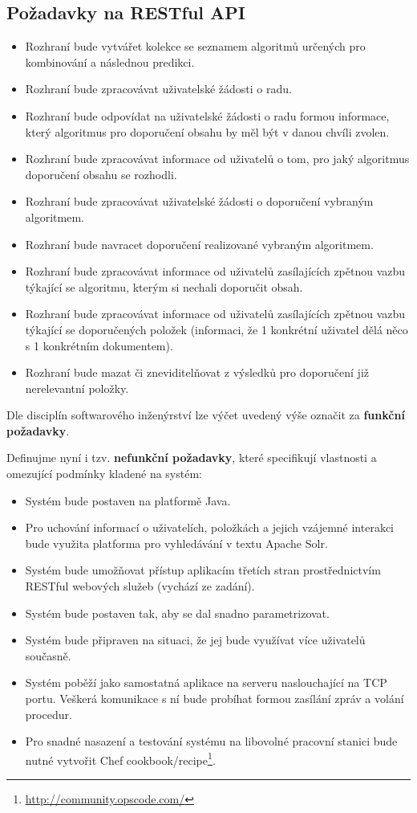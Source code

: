\documentclass[thesis=M,czech]{FITthesis}[2014/05/07]
\begin{document}
\subsection{Požadavky na RESTful API}
\begin{itemize}
	\item Rozhraní bude vytvářet kolekce se seznamem algoritmů určených pro kombinování a následnou predikci.
	\item Rozhraní bude zpracovávat uživatelské žádosti o radu.
	\item Rozhraní bude odpovídat na uživatelské žádosti o radu formou informace, který algoritmus pro doporučení obsahu by měl být v danou chvíli zvolen.
	\item Rozhraní bude zpracovávat informace od uživatelů o tom, pro jaký algoritmus doporučení obsahu se rozhodli.
	\item Rozhraní bude zpracovávat uživatelské žádosti o doporučení vybraným algoritmem.	
	\item Rozhraní bude navracet doporučení realizované vybraným algoritmem.
	\item Rozhraní bude zpracovávat informace od uživatelů zasílajících zpětnou vazbu týkající se algoritmu, kterým si nechali doporučit obsah.
	\item Rozhraní bude zpracovávat informace od uživatelů zasílajících zpětnou vazbu týkající se doporučených položek (informaci, že 1 konkrétní uživatel dělá něco s 1 konkrétním dokumentem).
	\item Rozhraní bude mazat či zneviditelňovat z výsledků pro doporučení již nerelevantní položky.
\end{itemize}

Dle disciplín softwarového inženýrství lze výčet uvedený výše označit za \textbf{funkční požadavky}.

Definujme nyní i tzv. \textbf{nefunkční požadavky}, které specifikují vlastnosti a omezující podmínky kladené na systém:

\begin{itemize}
	\item Systém bude postaven na platformě Java.
	\item Pro uchování informací o uživatelích, položkách a jejich vzájemné interakci bude využita platforma pro vyhledávání v textu Apache Solr.
	\item Systém bude umožňovat přístup aplikacím třetích stran prostřednictvím RESTful webových služeb (vychází ze zadání).
	\item Systém bude postaven tak, aby se dal snadno parametrizovat. 
	\item Systém bude připraven na situaci, že jej bude využívat více uživatelů současně.
	\item Systém poběží jako samostatná aplikace na serveru naslouchající na TCP portu. Veškerá komunikace s ní bude probíhat formou zasílání zpráv a volání procedur.
	\item Pro snadné nasazení a testování systému na libovolné pracovní stanici bude nutné vytvořit Chef cookbook/recipe\footnote{\url{http://community.opscode.com/}}.
\end{itemize}
\end{document}
